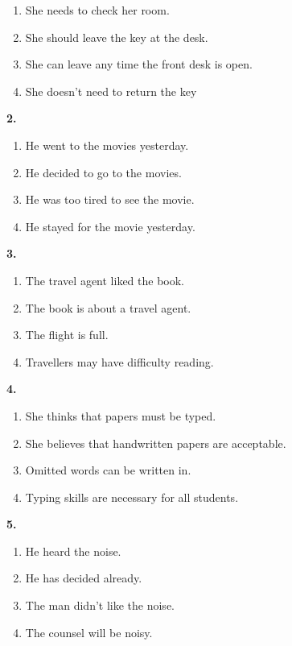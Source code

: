 \documentclass[12pt]{article}
\begin{document}
\begin{enumerate}[label=(\Alph*),leftmargin=*,itemsep=0.2em]
\item She needs to check her room.
\item She should leave the key at the desk.
\item She can leave any time the front desk is open.
\item She doesn't need to return the key
\end{enumerate}
\par
\vspace{0.25\baselineskip}
\noindent\textbf{2.}
\begin{enumerate}[label=(\Alph*),leftmargin=*,itemsep=0.2em]
\item He went to the movies yesterday.
\item He decided to go to the movies.
\item He was too tired to see the movie.
\item He stayed for the movie yesterday.
\end{enumerate}
\par
\vspace{0.25\baselineskip}
\noindent\textbf{3.}
\begin{enumerate}[label=(\Alph*),leftmargin=*,itemsep=0.2em]
\item The travel agent liked the book.
\item The book is about a travel agent.
\item The flight is full.
\item Travellers may have difficulty reading.
\end{enumerate}
\par
\vspace{0.25\baselineskip}
\noindent\textbf{4.}
\begin{enumerate}[label=(\Alph*),leftmargin=*,itemsep=0.2em]
\item She thinks that papers must be typed.
\item She believes that handwritten papers are acceptable.
\item Omitted words can be written in.
\item Typing skills are necessary for all students.
\end{enumerate}
\par
\vspace{0.25\baselineskip}
\noindent\textbf{5.}
\begin{enumerate}[label=(\Alph*),leftmargin=*,itemsep=0.2em]
\item He heard the noise.
\item He has decided already.
\item The man didn't like the noise.
\item The counsel will be noisy.
\end{enumerate}
\end{document}
